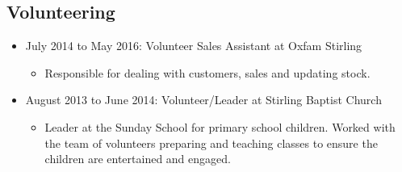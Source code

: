 \documentclass[10pt, a4paper]{article}
\begin{document}
	\subsection{Volunteering}
	\begin{itemize}
		\item July 2014 to May 2016: Volunteer Sales Assistant at Oxfam Stirling
		\begin{itemize}
			\item Responsible for dealing with customers, sales and updating stock.
		\end{itemize}
		\item August 2013 to June 2014: Volunteer/Leader at Stirling Baptist Church
		\begin{itemize}
			\item Leader at the Sunday School for primary school children. Worked with the team of volunteers preparing and teaching classes to ensure the children are entertained and engaged.
		\end{itemize}
	\end{itemize}
\end{document}
